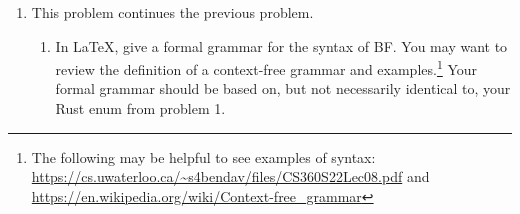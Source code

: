 \documentclass{article}
\begin{document}
\begin{enumerate}
\begin{enumerate}[(a)]
In your second unit test: you should be unable to construct that exact BF program; you may construct a related program
and assert that it does \emph{not} display as the string above.
\begin{verbatim}
assert!(prog.to_string() != "]><+[]".to_string());
\end{verbatim}

\item
Define a reference interpreter for BF programs.
This should be defined as a \texttt{BFInterpreter} struct/object
with a method \texttt{interpret()},
where the fields of the struct store
the relevant program state,
similar to how we defined a method \texttt{interpret()} on \texttt{VariableStore}
to interpret \texttt{RandProg} programs in class.
The code structure should look like this:
\begin{verbatim}
pub struct BFInterpreter {
    // ... define fields
}
impl BFInterpreter {
    fn new() -> Self {
        // TODO
        unimplemented!()
    }
    fn interpret(&mut self, prog: &BFProg) {
        // TODO
        unimplemented!()
    }
}
\end{verbatim}

\item
Write two unit tests which show that your reference interpreter is working correctly.
The first should be an example BF program which adds two input numbers (like 5 + 6).
The second one can be any example of your choosing.

\begin{verbatim}
#[test]
fn test_bf_interpreter_1() {
    unimplemented!()
}
#[test]
fn test_bf_interpreter_2() {
    unimplemented!()
}
\end{verbatim}
\end{enumerate}


\item
This problem continues the previous problem.

\begin{enumerate}
\item
In LaTeX, give a formal grammar for the syntax of BF. You may want to review the definition of a
context-free grammar and examples.\footnote{The following may be helpful to see examples of syntax: \url{https://cs.uwaterloo.ca/~s4bendav/files/CS360S22Lec08.pdf} and \url{https://en.wikipedia.org/wiki/Context-free_grammar}}
Your formal grammar should be based on, but not necessarily identical to, your Rust enum from problem 1.


\end{enumerate}
\end{enumerate}
\end{document}

